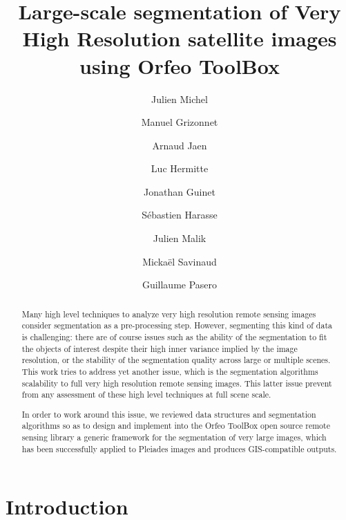 \documentclass{josis}
\begin{document}
\title{Large-scale segmentation of Very High Resolution satellite images using Orfeo ToolBox}

\author{Julien Michel}
\author{Manuel Grizonnet}
\author{Arnaud Jaen}
\author{Luc Hermitte}
\author{Jonathan Guinet}
\author{S\'ebastien Harasse}
\author{Julien Malik}
\author{Micka\"el Savinaud}
\author{Guillaume Pasero}


\maketitle


\begin{abstract}
Many high level techniques to analyze very high resolution remote
sensing images consider segmentation as a pre-processing
step. However, segmenting this kind of data is challenging: there are
of course issues such as the ability of the segmentation to fit the
objects of interest despite their high inner variance implied by the
image resolution, or the stability of the segmentation quality across
large or multiple scenes. This work tries to address yet another
issue, which is the segmentation algorithms scalability to full very
high resolution remote sensing images. This latter issue prevent from
any assessment of these high level techniques at full scene scale.

In order to work around this issue, we reviewed data structures and
segmentation algorithms so as to design and implement into the Orfeo
ToolBox open source remote sensing library a generic framework for
the segmentation of very large images, which has been successfully
applied to Pleiades images and produces GIS-compatible outputs.

\end{abstract}


\section{Introduction}
\end{document}
